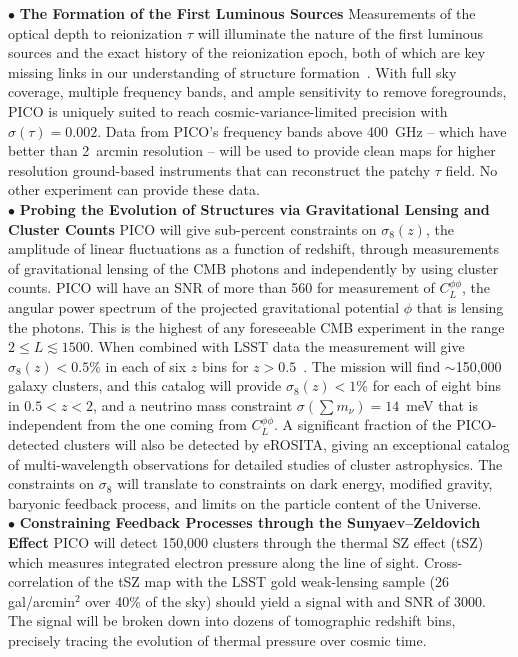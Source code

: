 \documentclass[PICOAPC.tex]{subfiles}
\begin{document}
 
$\bullet$ {\bf The Formation of the First Luminous Sources} \hspace{0.1in} \label{sec:luminoussources}  Measurements of the optical depth to reionization $\tau$ will illuminate the nature of the first luminous sources and the exact history of the reionization epoch, both of which are key missing links in our understanding of structure formation~\citep{alvarez_swp}.  With full sky coverage, multiple frequency bands, and ample sensitivity to remove foregrounds, PICO is uniquely suited to reach cosmic-variance-limited precision with $\sigma(\tau)=0.002$. Data from PICO's frequency bands above 400~GHz -- which have better than 2~arcmin resolution  -- will be used to provide clean maps for higher resolution ground-based instruments that can reconstruct the patchy $\tau$ field. No other experiment can provide these data. \\
%
$\bullet$ {\bf Probing the Evolution of Structures via Gravitational Lensing and Cluster Counts} \hspace{0.1in} \label{sec:gravitationallensing}   
PICO will give sub-percent constraints on $\sigma_8(z)$, the amplitude of linear fluctuations as a function of redshift, through measurements of gravitational lensing of the CMB photons and independently by using cluster counts. 
PICO will have an \ac{SNR} of more than 560 for measurement of $C_{L}^{\phi \phi}$, the angular power spectrum of the projected gravitational potential $\phi$ that is lensing the photons. This is the highest of any foreseeable CMB experiment in the range $2 \leq L \lesssim 1500$. When combined with LSST data the measurement will give $\sigma_8(z) <0.5\%$ in each of six $z$ bins for $z>0.5$~\cite{pico_report}.
The mission will find $\sim$150,000 galaxy clusters, and this catalog will provide $\sigma_{8}(z) < 1\%$ for each of eight bins in $0.5 < z < 2$, and a neutrino mass constraint $\sigma(\sum m_{\nu}) = 14$~meV that is independent from the one coming from $C_{L}^{\phi \phi}$. A significant fraction of the PICO-detected clusters will also be detected by eROSITA, giving an exceptional catalog of multi-wavelength observations for detailed studies of cluster astrophysics. The constraints on $\sigma_{8}$ will translate to constraints on dark energy, modified gravity, baryonic feedback process, and limits on the particle content of the Universe. \\
%
$\bullet$ {\bf Constraining Feedback Processes through the Sunyaev--Zeldovich Effect} \hspace{0.1in} \label{sec:sz}
PICO will detect 150,000 clusters through the thermal SZ effect (tSZ) which measures integrated electron pressure along the line of sight.  Cross-correlation of the tSZ map with the LSST gold weak-lensing sample (26 gal/arcmin$^2$ over 40\% of the sky) should yield a signal with and \ac{SNR} of 3000.  The signal will be broken down into dozens of tomographic redshift bins, precisely tracing the evolution of thermal pressure over cosmic time.
\end{document}
